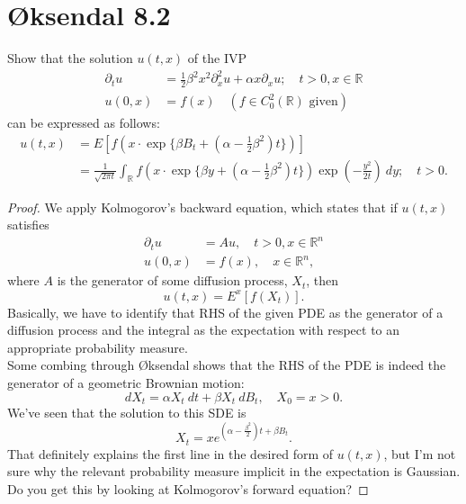 \documentclass[11pt,letterpaper]{report}
\newcommand{\reals}{\mathbb{R}}
\theoremstyle{definition}
\begin{document}
\section*{\O ksendal 8.2}
Show that the solution $u(t, x)$ of the IVP
\begin{align*}
\partial_t u &= \frac{1}{2}\beta^2x^2\partial^2_xu + \alpha x\partial_x u;\quad t>0, x\in \reals\\
u(0, x) &= f(x)\quad (f\in C_0^2(\reals)\text{ given})
\end{align*}
can be expressed as follows:
\begin{align*}
	u(t,x) &= E[f(x\cdot \exp\{\beta B_t + (\alpha - \frac{1}{2}\beta^2)t\})]\\
	&= \frac{1}{\sqrt{2\pi t}}\int_\reals f(x\cdot \exp\{\beta y + (\alpha - \frac{1}{2}\beta^2)t\})\exp\left(-\frac{y^2}{2t}\right)\ dy;\quad t>0.
\end{align*}
\begin{proof}
	We apply Kolmogorov's backward equation, which states that if $u(t, x)$ satisfies
	\begin{align*}
		\partial_t u &= Au,\quad t>0, x\in \reals^n\\
		u(0, x) &= f(x),\quad x\in \reals^n,
	\end{align*}
	where $A$ is the generator of some diffusion process, $X_t$, then
	\[
	u(t, x) = E^x[f(X_t)].
	\]
	Basically, we have to identify that RHS of the given PDE as the generator of a diffusion process and the integral as the expectation with respect to an appropriate probability measure.\\

	\noindent Some combing through \O ksendal shows that the RHS of the PDE is indeed the generator of a geometric Brownian motion:
	\[
	dX_t = \alpha X_t\ dt + \beta X_t\ dB_t,\quad X_0 = x>0.
	\]
	We've seen that the solution to this SDE is
	\[
	X_t = xe^{(\alpha -\frac{\beta^2}{2})t + \beta B_t}.
	\]
	That definitely explains the first line in the desired form of $u(t, x)$, but I'm not sure why the relevant probability measure implicit in the expectation is Gaussian. Do you get this by looking at Kolmogorov's forward equation?
\end{proof}
\end{document}
